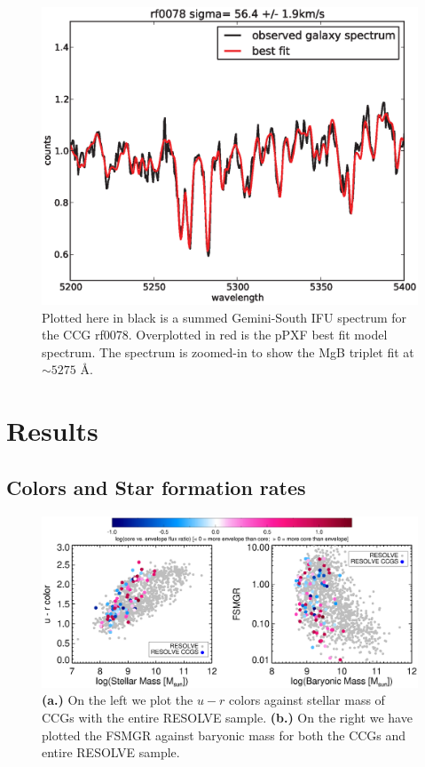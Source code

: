 \documentclass[iop,apj]{emulateapj}
\begin{document}
\begin{figure}[t]
\begin{center}
\includegraphics[scale=0.4]{rf0078ppxffit.eps}
\caption{Plotted here in black is a summed Gemini-South IFU spectrum for the CCG rf0078. Overplotted in red is the pPXF best fit model spectrum. The spectrum is zoomed-in to show the MgB triplet fit at $\sim 5275$ \AA.}
\label{fig:ppxffit}
\end{center}
\end{figure}

\section{Results}
\label{results}
\subsection{Colors and Star formation rates}

\begin{figure}[t!]
\begin{center}
\includegraphics[scale=0.65]{sfr_mbary.eps}
\caption{\textbf{(a.)} On the left we plot the $u-r$ colors against stellar mass of CCGs with the entire RESOLVE sample. \textbf{(b.)} On the right we have plotted the FSMGR against baryonic mass for both the CCGs and entire RESOLVE sample. }
\label{fig:fsmgr}
\end{center}
\end{figure}
\end{document}
